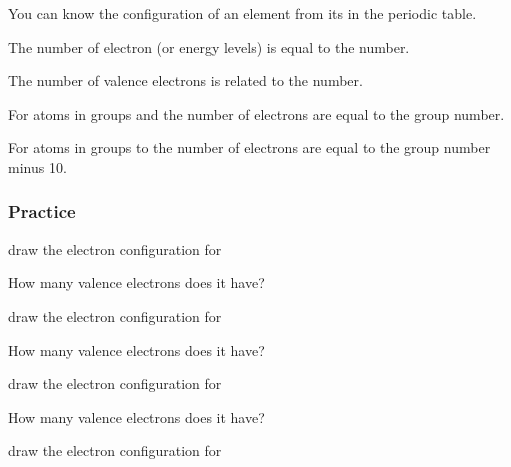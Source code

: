\documentclass[12pt]{exam}
\begin{document}
\begin{questions}
\question You can know the \fillin[electron][3cm] configuration of an element from its \fillin[position][3cm] in the periodic table.

\question The number of electron \fillin[shells][2cm] (or energy levels) is equal to the \fillin[period][2cm] number.


\question The number of valence electrons is related to the \fillin[group][2cm] number.

\question For atoms in groups \fillin[one][2cm] and \fillin[two][2cm] the number of \fillin[valence][2cm] electrons are equal to the group number.

\question For atoms in groups \fillin[13][2cm] to \fillin[18][2cm] the number of \fillin[valence][2cm] electrons are equal to the group number minus 10.



\subsubsection{Practice}

\question draw the electron configuration for 

How many valence electrons does it have? \fillin[1][1cm]


\question draw the electron configuration for 

How many valence electrons does it have? \fillin[2][1cm]

\question draw the electron configuration for 

How many valence electrons does it have? \fillin[1][1cm]

\question draw the electron configuration for 


\end{questions}
\end{document}

